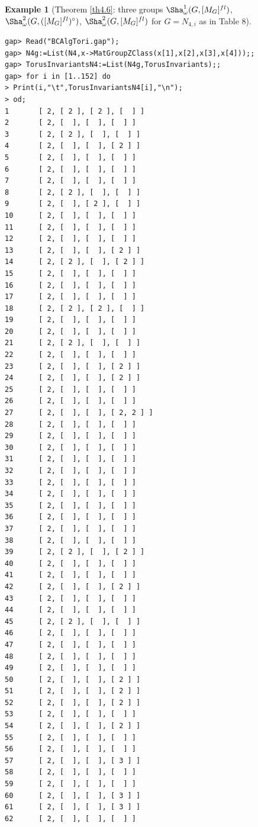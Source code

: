 \documentclass{amsart}
\theoremstyle{plain}
\theoremstyle{definition}
\newtheorem{example}[theorem]{Example}
\theoremstyle{remark}
\begin{document}
\bigskip
\begin{example}[{Theorem \ref{th4.6}: three groups $\Sha^1_\omega(G,[M_G]^{fl})$, $\Sha^2_\omega(G,([M_G]^{fl})^\circ)$, $\Sha^2_\omega(G,[M_G]^{fl})$ for $G=N_{4,i}$ as in Table $8$}]\label{exTI-N4}~\vspace*{-5mm}\\
\begin{verbatim}
gap> Read("BCAlgTori.gap");
gap> N4g:=List(N4,x->MatGroupZClass(x[1],x[2],x[3],x[4]));;
gap> TorusInvariantsN4:=List(N4g,TorusInvariants);;
gap> for i in [1..152] do
> Print(i,"\t",TorusInvariantsN4[i],"\n");
> od;
1       [ 2, [ 2 ], [ 2 ], [  ] ]
2       [ 2, [  ], [  ], [  ] ]
3       [ 2, [ 2 ], [  ], [  ] ]
4       [ 2, [  ], [  ], [ 2 ] ]
5       [ 2, [  ], [  ], [  ] ]
6       [ 2, [  ], [  ], [  ] ]
7       [ 2, [  ], [  ], [  ] ]
8       [ 2, [ 2 ], [  ], [  ] ]
9       [ 2, [  ], [ 2 ], [  ] ]
10      [ 2, [  ], [  ], [  ] ]
11      [ 2, [  ], [  ], [  ] ]
12      [ 2, [  ], [  ], [  ] ]
13      [ 2, [  ], [  ], [ 2 ] ]
14      [ 2, [ 2 ], [  ], [ 2 ] ]
15      [ 2, [  ], [  ], [  ] ]
16      [ 2, [  ], [  ], [  ] ]
17      [ 2, [  ], [  ], [  ] ]
18      [ 2, [ 2 ], [ 2 ], [  ] ]
19      [ 2, [  ], [  ], [  ] ]
20      [ 2, [  ], [  ], [  ] ]
21      [ 2, [ 2 ], [  ], [  ] ]
22      [ 2, [  ], [  ], [  ] ]
23      [ 2, [  ], [  ], [ 2 ] ]
24      [ 2, [  ], [  ], [ 2 ] ]
25      [ 2, [  ], [  ], [  ] ]
26      [ 2, [  ], [  ], [  ] ]
27      [ 2, [  ], [  ], [ 2, 2 ] ]
28      [ 2, [  ], [  ], [  ] ]
29      [ 2, [  ], [  ], [  ] ]
30      [ 2, [  ], [  ], [  ] ]
31      [ 2, [  ], [  ], [  ] ]
32      [ 2, [  ], [  ], [  ] ]
33      [ 2, [  ], [  ], [  ] ]
34      [ 2, [  ], [  ], [  ] ]
35      [ 2, [  ], [  ], [  ] ]
36      [ 2, [  ], [  ], [  ] ]
37      [ 2, [  ], [  ], [  ] ]
38      [ 2, [  ], [  ], [  ] ]
39      [ 2, [ 2 ], [  ], [ 2 ] ]
40      [ 2, [  ], [  ], [  ] ]
41      [ 2, [  ], [  ], [  ] ]
42      [ 2, [  ], [  ], [ 2 ] ]
43      [ 2, [  ], [  ], [  ] ]
44      [ 2, [  ], [  ], [  ] ]
45      [ 2, [ 2 ], [  ], [  ] ]
46      [ 2, [  ], [  ], [  ] ]
47      [ 2, [  ], [  ], [  ] ]
48      [ 2, [  ], [  ], [  ] ]
49      [ 2, [  ], [  ], [  ] ]
50      [ 2, [  ], [  ], [ 2 ] ]
51      [ 2, [  ], [  ], [ 2 ] ]
52      [ 2, [  ], [  ], [ 2 ] ]
53      [ 2, [  ], [  ], [  ] ]
54      [ 2, [  ], [  ], [ 2 ] ]
55      [ 2, [  ], [  ], [  ] ]
56      [ 2, [  ], [  ], [  ] ]
57      [ 2, [  ], [  ], [ 3 ] ]
58      [ 2, [  ], [  ], [  ] ]
59      [ 2, [  ], [  ], [  ] ]
60      [ 2, [  ], [  ], [ 3 ] ]
61      [ 2, [  ], [  ], [ 3 ] ]
62      [ 2, [  ], [  ], [  ] ]

\end{verbatim}
\end{example}
\end{document}
